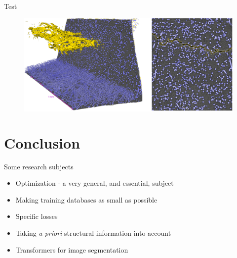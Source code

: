 \documentclass[xcolor=pdftex,dvipsnames,table,mathserif]{beamer}
\begin{document}
\begin{frame}{Test}

\begin{figure}[ht]
  \centering
  \includegraphics[width=\textwidth]{casagrande_test}
\end{figure}


\end{frame}



\section{Conclusion}


\begin{frame}{Some research subjects}

  \begin{itemize}
  \item Optimization - a very general, and essential, subject
  \item Making training databases as small as possible
  \item Specific losses
  \item Taking  {\it a priori} structural information into account
  \item Transformers for image segmentation
  \end{itemize}

\end{frame}
\end{document}
